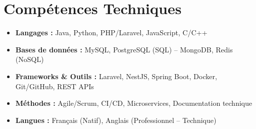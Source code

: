 \documentclass[a4paper,11pt]{article}
\begin{document}
\section{Compétences Techniques}
\begin{itemize}[leftmargin=*, nosep]
    \item \small{\textbf{Langages :} Java, Python, PHP/Laravel, JavaScript, C/C++}
    \item \small{\textbf{Bases de données :} MySQL, PostgreSQL (SQL) -- MongoDB, Redis (NoSQL)}
    \item \small{\textbf{Frameworks \& Outils :} Laravel, NestJS, Spring Boot, Docker, Git/GitHub, REST APIs}
    \item \small{\textbf{Méthodes :} Agile/Scrum, CI/CD, Microservices, Documentation technique}
    \item \small{\textbf{Langues :} Français (Natif), Anglais (Professionnel -- Technique)}
\end{itemize}

\end{document}
